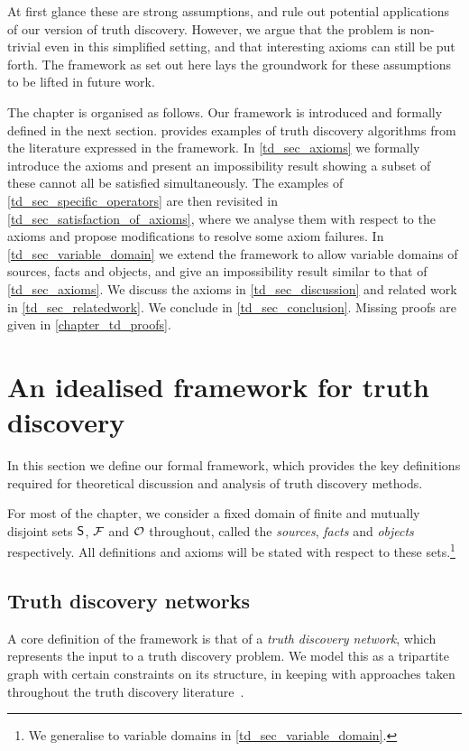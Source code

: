At first glance these are strong assumptions, and rule out potential
applications of our version of truth discovery. However, we argue that the
problem is non-trivial even in this simplified setting, and that interesting
axioms can still be put forth. The framework as set out here lays the
groundwork for these assumptions to be lifted in future work.

The chapter is organised as follows. Our framework is introduced and formally
defined in the next section.  provides examples of
truth discovery algorithms from the literature expressed in the framework. In
\cref{td_sec_axioms} we formally introduce the axioms and present an impossibility
result showing a subset of these cannot all be satisfied simultaneously. The
examples of \cref{td_sec_specific_operators} are then revisited in
\cref{td_sec_satisfaction_of_axioms}, where we analyse them with respect to the
axioms and propose modifications to resolve some axiom failures. In
\cref{td_sec_variable_domain} we extend the framework to allow variable domains of
sources, facts and objects, and give an impossibility result similar to that of
\cref{td_sec_axioms}. We discuss the axioms in \cref{td_sec_discussion} and related
work in \cref{td_sec_relatedwork}. We conclude
in \cref{td_sec_conclusion}. Missing proofs are given in \cref{chapter_td_proofs}.


\section{An idealised framework for truth discovery}
\label{td_sec_framework}

In this section we define our formal framework, which provides the key
definitions required for theoretical discussion and analysis of truth discovery
methods.

For most of the chapter, we consider a fixed domain of finite and mutually
disjoint sets $\S$, $\F$ and $\O$ throughout, called the \emph{sources},
\emph{facts} and \emph{objects} respectively. All definitions and axioms will
be stated with respect to these sets.\footnote{We generalise to variable
domains in \cref{td_sec_variable_domain}.}

\subsection{Truth discovery networks}

A core definition of the framework is that of a \emph{truth discovery network},
which represents the input to a truth discovery problem. We model this as a
tripartite graph with certain constraints on its structure, in keeping with
approaches taken throughout the truth discovery
literature~\cite{yin2008,gupta2011survey}.


